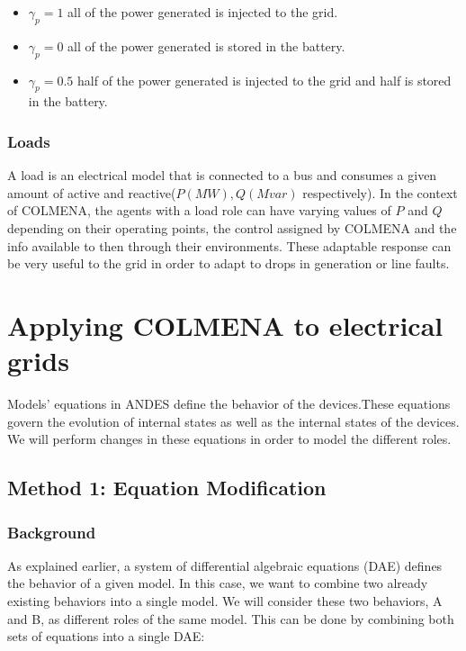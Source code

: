 \documentclass{report}
\begin{document}
\begin{itemize}
    \item $\gamma_p = 1$ all of the power generated is injected to the grid.
    \item $\gamma_p = 0$ all of the power generated is stored in the battery.
    \item $\gamma_p = 0.5$ half of the power generated is injected to the grid and half is stored in the battery.
\end{itemize}

\subsubsection*{Loads}

A load is an electrical model that is connected to a bus and consumes a given amount of active and reactive($P(MW),  Q (Mvar)$ respectively). In the context of COLMENA, the agents with a load role can have varying values of $P$ and $Q$ depending on their operating points, the control assigned by COLMENA and the info available to then through their environments. These adaptable response can be very useful to the grid in order to adapt to drops in generation or line faults.    

\section{Applying COLMENA to electrical grids}

Models' equations in ANDES define the behavior of the devices.These equations govern the evolution of internal states as well as the internal states of the devices. We will perform changes in these equations in order to model the different roles.

\subsection{Method 1: Equation Modification}

\subsubsection{Background}

As explained earlier, a system of differential algebraic equations (DAE) defines the behavior of a given model. In this case, we want to combine two already existing behaviors into a single model. We will consider these two behaviors, A and B, as different roles of the same model. This can be done by combining both sets of equations into a single DAE:
\end{document}
